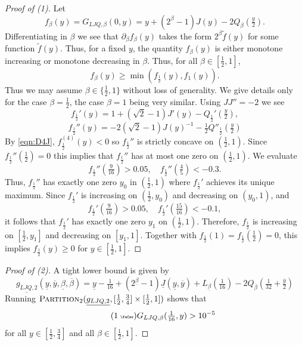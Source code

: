 \documentclass[12pt]{amsart}
\theoremstyle{plain}
\newcommand{\auto}{\tag{\addtocounter{equation}{1}\theequation\;{\tiny\faCar}}}
\theoremstyle{definition}
\theoremstyle{remark}
\numberwithin{equation}{section}
\begin{document}
\begin{proof}[Proof of (1)]
Let 
\[ f_\beta(y)=G_{LJQ,\beta}(0,y) = y + (2^\beta-1) J(y) - 2Q_\beta(\tfrac{y}2). \]
Differentiating in $\beta$ we see that $\partial_\beta f_\beta(y)$ takes the form $2^\beta \widetilde{f}(y)$ for some function $\widetilde{f}(y)$. Thus, for a fixed $y$, the quantity $f_\beta(y)$ is either monotone increasing or monotone decreasing in $\beta$. Thus, for all $\beta\in[\frac12, 1]$,
\[ f_\beta(y)\ge \min(f_{\frac12}(y), f_1(y)). \]
Thus we may assume $\beta\in\{\tfrac{1}{2},1\}$ without loss of generality. We give details only for the case $\beta=\frac12$, the case $\beta=1$ being very similar.
Using $JJ''=-2$ we see
\[ f_{\frac12}'(y) = 1 + (\sqrt{2}-1)J'(y) - Q_{\frac12}'(\tfrac{y}2), \]
\[f_{\frac12}''(y) =  -2 (\sqrt{2}-1)  J(y)^{-1} -\tfrac12 Q''_{\frac12}(\tfrac{y}2)\]
By \eqref{eqn:D4J}, $f_{\frac12}^{(4)}(y)<0$
so $f_{\frac12}''$ is  strictly concave on $(\frac12,1)$. Since $f_{\frac12}''(\tfrac{1}{2})=0$ this implies that $f_{\frac12}''$ has at most one  zero on $(\tfrac{1}{2},1)$.   We evaluate 
\begin{equation}
f_{\frac12}''(\tfrac{9}{16})>0.05,\quad
f_{\frac12}''(\tfrac{4}{5})<-0.3.
\end{equation} 
Thus, $f_{\frac12}''$  has  exactly one zero $y_0$ in  $(\tfrac{1}{2},1)$ where $f_{\frac12}'$
achieves its unique maximum.  Since $f_{\frac12}'$  is increasing on $(\tfrac{1}{2},y_0)$ and decreasing on $(y_0,1)$, and
\begin{equation}
f_{\frac12}'(\tfrac{9}{16})>0.05,\quad
f_{\frac12}'(\tfrac{15}{16})<-0.1,
\end{equation}  
it follows  that   $f_{\frac12}'$ has exactly one zero $y_1$ on $(\tfrac{1}{2},1)$. Therefore,   $f_{\frac12}$ is increasing on $[\frac12,y_1]$ and decreasing on $[y_1,1]$.  Together with   $f_{\frac12}(1)=f_{\frac12}(\tfrac{1}{2})=0$, this  implies $f_{\frac12}(y)\geq 0$ for $y\in [\frac12,1]$.
\end{proof}

\begin{proof}[Proof of (2)]
A tight lower bound is given by
\[  \underline{g_{LJQ,2}}(\underline{y},\overline{y},\underline{\beta},\overline{\beta}) = \underline{y}-\tfrac{1}{16} + (2^{\underline{\beta}}-1) \underline{J}(\underline{y},\overline{y}) +L_{\underline{\beta}}(\tfrac{1}{16})-2Q_{\overline{\beta}}(\tfrac{1}{32}+ \tfrac{\overline{y}}{2})\]
Running  
$\textsc{Partition}_2(\underline{g_{LJQ,2}},[\tfrac{1}{2},\tfrac{3}{4}]\times [\tfrac12,1])$ shows that
\begin{equation}\label{eqn:g_LJQ_2_auto}\auto
G_{LJQ,\beta}(\tfrac1{16},y)>10^{-5}
\end{equation}
for all $y\in [\frac12,\frac34]$ and all $\beta\in [\frac12,1]$.
\end{proof}
\end{document}

